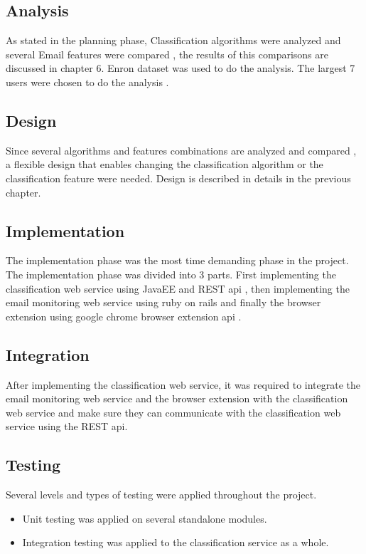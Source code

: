 \subsection{Analysis}
As stated in the planning phase, Classification algorithms were analyzed and several Email features were compared ,
the results of this comparisons are discussed in chapter 6.
Enron dataset was used to do the analysis. The largest 7 users were chosen to do the analysis \cite{RON04}.

\subsection{Design}
Since several algorithms and features combinations are analyzed and compared , a flexible design that enables changing
the classification algorithm or the classification feature were needed.
Design is described in details in the previous chapter.

\subsection{Implementation}
The implementation phase was the most time demanding phase in the
project.
The implementation phase was divided into 3 parts.
First implementing the classification web service using JavaEE and REST api \cite{REST},
then implementing the email monitoring web service using ruby on rails \cite{ROR}
and finally the browser extension using google chrome browser extension api \cite{CHROME}.
\subsection{Integration}
After implementing the classification web service,
it was required to integrate the email monitoring web service and the browser extension with
the classification web service and make sure they can communicate with the classification web
service using the REST api.

\subsection{Testing}
Several levels and types of testing were applied throughout the project.
\begin{itemize}
\item Unit testing was applied on several standalone modules.
\item Integration testing was applied to the classification service as a whole.
\end{itemize}

